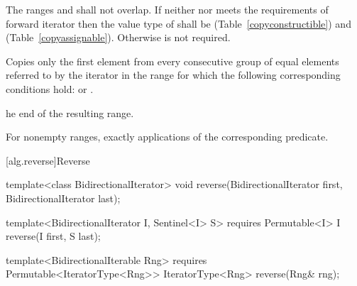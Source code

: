 \begin{itemdescr}
\pnum
\requires
{}
The ranges
and
shall not overlap. If neither
nor
meets the requirements of forward iterator then the value type of
shall be  (Table~\ref{copyconstructible}) and
 (Table~\ref{copyassignable}).
Otherwise  is not required.

\pnum
\effects
Copies only the first element from every consecutive group of equal elements referred to by
the iterator
in the range
for which the following corresponding conditions hold:
or
.

\pnum
\returns
{}he end of the resulting range.

\pnum
\complexity
For nonempty ranges, exactly
applications of the corresponding predicate.
\end{itemdescr}

[alg.reverse]{Reverse}

%
\begin{removedblock}
\begin{itemdecl}
template<class BidirectionalIterator>
  void reverse(BidirectionalIterator first, BidirectionalIterator last);
\end{itemdecl}
\end{removedblock}
\begin{addedblock}
\begin{itemdecl}
template<BidirectionalIterator I, Sentinel<I> S>
  requires Permutable<I>
  I reverse(I first, S last);

template<BidirectionalIterable Rng>
  requires Permutable<IteratorType<Rng>>
  IteratorType<Rng>
    reverse(Rng& rng);
\end{itemdecl}
\end{addedblock}

